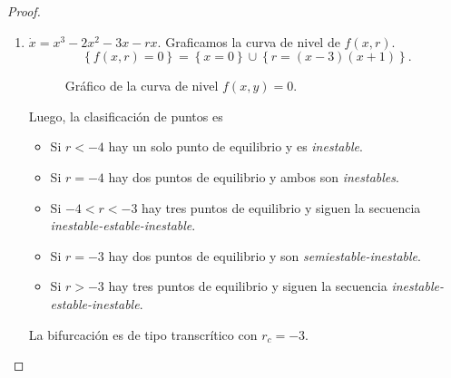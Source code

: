 \begin{proof}
\begin{enumerate}[
label=(\alph*),topsep=0pt,itemsep=0pt,leftmargin=1.5em,rightmargin=1em]
    \item \(\dot{x} = x^3 - 2x^2 - 3x - rx\).
    Graficamos la curva de nivel de \(f(x,r)\).
    \[
        \left\{ f(x,r) = 0 \right\}
        =
        \left\{ x = 0 \right\}
        \cup
        \left\{ r = (x-3)(x+1) \right\}
    .\]

%
{
    \begin{figure}[H]
    \centering
    \caption{Gráfico de la curva de nivel \(f(x,y) = 0\).}
    \end{figure}
}%
{%
    Luego, la clasificación de puntos es
    \begin{itemize}[itemsep=0pt, leftmargin=2em, rightmargin=2em]
        \item Si \(r < -4\) hay un solo punto de equilibrio y es {\it inestable}.
        \item Si \(r = -4\) hay dos puntos de equilibrio y ambos son {\it
        inestables}.
        \item Si \(-4 < r < -3\) hay tres puntos de equilibrio y siguen la
        secuencia {\it inestable-estable-inestable}.
        \item Si \(r = -3\) hay dos puntos de equilibrio y son
        {\it semiestable-inestable}.
        \item Si \(r > -3\) hay tres puntos de equilibrio y siguen la secuencia
        {\it inestable-estable-inestable}.
    \end{itemize}
    La bifurcación es de tipo transcrítico con \(r_c = -3\).
}
\end{enumerate}
\end{proof}

